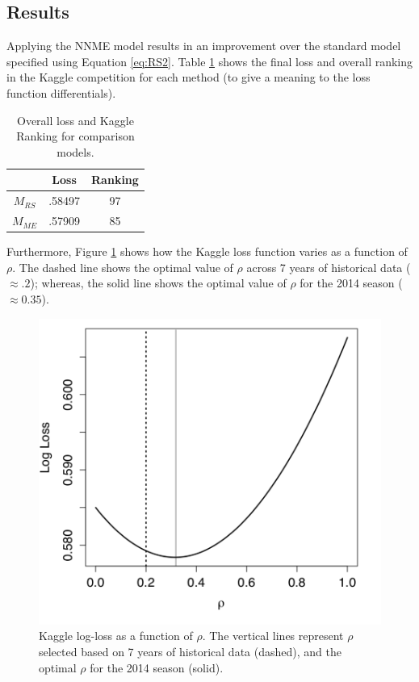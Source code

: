 \documentclass[letterpaper,12pt]{article}
\begin{document}
\subsection{Results}
Applying the NNME model results in an improvement over the standard model specified using Equation \ref{eq:RS2}. Table \ref{tab:results} shows the final loss and overall ranking in the Kaggle competition for each method (to give a meaning to the loss function differentials).
\begin{table}[h!]
\caption{Overall loss and Kaggle Ranking for comparison models.\label{tab:results}}
\centering
\begin{tabular}{|c|cc|}
  \hline
    & Loss & Ranking\\ 
  \hline
  $M_{RS}$ & .58497 & 97 \\
  $M_{ME}$ & .57909 & 85 \\
   \hline
   \hline
\end{tabular}
\end{table}
Furthermore, Figure \ref{fig:result} shows how the Kaggle loss function varies as a function of $\rho$. The dashed line shows the optimal value of $\rho$ across 7 years of historical data ($\approx .2$); whereas, the solid line shows the optimal value of $\rho$ for the 2014 season ($\approx 0.35$). 
\begin{figure}[h!]
\centering
\includegraphics[width=.5\textwidth]{results_2014.pdf}
\caption{Kaggle log-loss as a function of $\rho$. The vertical lines represent $\rho$ selected based on 7 years of historical data (dashed), and the optimal $\rho$ for the 2014 season (solid).}
\label{fig:result}
\end{figure} 
\end{document}

